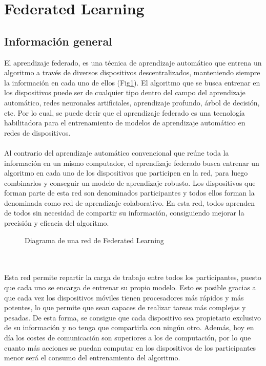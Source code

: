 \section{Federated Learning}

\subsection{Información general}
El aprendizaje federado, es una técnica de aprendizaje automático que entrena un algoritmo a través de diversos dispositivos descentralizados, manteniendo siempre la información en cada uno de ellos (Fig\ref{fig:FedLearArquitectura}). El algoritmo que se busca entrenar en los dispositivos puede ser de cualquier tipo dentro del campo del aprendizaje automático, redes neuronales artificiales, aprendizaje profundo, árbol de decisión, etc. Por lo cual, se puede decir que el aprendizaje federado es una tecnología habilitadora para el entrenamiento de modelos de aprendizaje automático en redes de dispositivos.
\\ \\
Al contrario del aprendizaje automático convencional que reúne toda la información en un mismo computador, el aprendizaje federado busca entrenar un algoritmo en cada uno de los dispositivos que participen en la red, para luego combinarlos y conseguir un modelo de aprendizaje robusto. Los dispositivos que forman parte de esta red son denominados participantes y todos ellos forman la denominada como red de aprendizaje colaborativo. En esta red, todos aprenden de todos sin necesidad de compartir su información, consiguiendo mejorar la precisión y eficacia del algoritmo. 
\begin{figure}[thbp]
    \centering
    \caption{Diagrama de una red de Federated Learning} 
    \label{fig:FedLearArquitectura}
\end{figure}
\\ \\
Esta red permite repartir la carga de trabajo entre todos los participantes, puesto que cada uno se encarga de entrenar su propio modelo. Esto es posible gracias a que cada vez los dispositivos móviles tienen procesadores más rápidos y más potentes, lo que permite que sean capaces de realizar tareas más complejas y pesadas. De esta forma, se consigue que cada dispositivo sea propietario exclusivo de su información y no tenga que compartirla con ningún otro. Además, hoy en día los costes de comunicación son superiores a los de computación, por lo que cuanto más acciones se puedan computar en los dispositivos de los participantes menor será el consumo del entrenamiento del algoritmo. 
